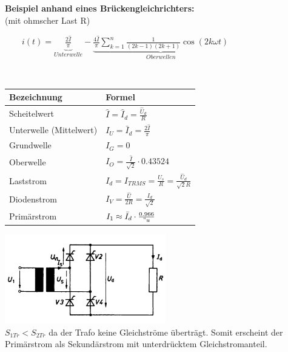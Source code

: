 	\begin{minipage}[c]{8cm} 
	   \textbf{Beispiel anhand eines Brückengleichrichters:}	  	\\
	   (mit ohmscher Last R)
	\end{minipage}   
	\begin{minipage}[c]{10cm} 	
	   $ \qquad i(t) = \underbrace{\frac{2 \hat{I}}{\pi}}_{Unterwelle} - \underbrace{\frac{4\hat{I}}{\pi} \sum\limits_{k=1}^n \frac{1}{(2k-1)(2k+1)} \cos(2k\omega t)}_{Oberwellen} $
	\end{minipage}\\
\begin{minipage}[c]{10cm}  
		\begin{tabular}{| l | l |}
    		\hline 
      		\textbf{Bezeichnung}
      		& \textbf{Formel} \\
      		\hline
      		Scheitelwert 
      		& $\hat{I} = \hat{I}_d = \frac{\hat{U}_d}{R} $ \\
      		Unterwelle (Mittelwert)
      		& $I_U = \bar{I}_d = \frac{2 \hat{I}}{\pi}$ \\
      		Grundwelle
      		& $I_G = 0$ \\
      		Oberwelle
      		& $I_O = \frac{\hat{I}}{\sqrt{2}} \cdot 0.43524$ \\
      		Laststrom
      		& $I_{d} = I_{TRMS} =  \frac{U_s}{R}= \frac{\hat{U}_d}{\sqrt{2}R}$ \\ 
      		Diodenstrom
      		& $I_{V} = \frac{\hat{U}}{2 R} = \frac{I_{d}}{\sqrt{2}}$ \\
      		Prim\"arstrom
      		& $I_1 \approx \bar{I}_d \cdot \frac{0.966}{"u}$ \\
      	 	\hline
    	\end{tabular}
	\end{minipage}   
	\begin{minipage}[c]{8cm}  
			\includegraphics[width=7cm]{bilder/brueckengleichrichter.png}  \\			
	$S_{1Tr} < S_{2Tr}$ da der Trafo keine Gleichstr\"ome übertr\"agt. Somit erscheint der Prim\"arstrom
	als Sekund\"arstrom mit unterdrücktem Gleichstromanteil.			
	\end{minipage}
